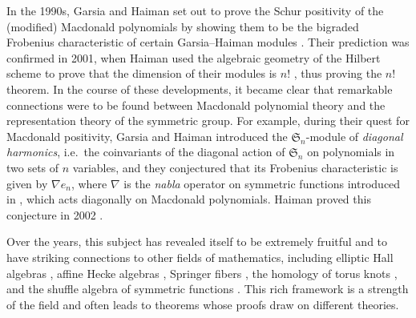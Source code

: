 \documentclass[reqno]{amsart}
\theoremstyle{plain}
\theoremstyle{definition}
\theoremstyle{remark}
\newcommand{\<}{\langle}
\renewcommand{\>}{\rangle}
\begin{document}
In the 1990s, Garsia and Haiman set out to prove the Schur positivity of the (modified) Macdonald polynomials by showing them to be the bigraded Frobenius characteristic of certain Garsia--Haiman modules \cite{GarsiaHaiman1993GradedRepresentationModel}. Their prediction was confirmed in 2001, when Haiman used the algebraic geometry of the Hilbert scheme to prove that the dimension of their modules is $n!$ \cite{Haiman2001nFactorial}, thus proving the $n!$ theorem. In the course of these developments, it became clear that remarkable connections were to be found between Macdonald polynomial theory and the representation theory of the symmetric group. For example, during their quest for Macdonald positivity, Garsia and Haiman introduced the $\mathfrak{S}_n$-module of \emph{diagonal harmonics}, i.e.\ the coinvariants of the diagonal action of $\mathfrak{S}_n$ on polynomials in two sets of $n$ variables, and they conjectured that its Frobenius characteristic is given by $\nabla e_n$, where $\nabla$ is the \emph{nabla} operator on symmetric functions introduced in \cite{BergeronGarsiaHaimanTesler1999IdentitiesPositivityConjectures}, which acts diagonally on Macdonald polynomials. Haiman proved this conjecture in 2002 \cite{Haiman2002HilbertScheme}.

Over the years, this subject has revealed itself to be extremely fruitful and to have striking connections to other fields of mathematics, including elliptic Hall algebras \cites{SchiffmannVasserot2011EllipticHallAlgebra,BHMPS2023ShuffleAnyLine}, affine Hecke algebras \cite{CarlssonMellit2018ShuffleConjecture}, Springer fibers \cite{Mellit2020SpringerFibers}, the homology of torus knots \cites{GorskyNegut2015RefinedKnotInvariants, Mellit2022HomologyTorusKnots}, and the shuffle algebra of symmetric functions \cite{Negut2014ShuffleAlgebra}. This rich framework is a strength of the field and often leads to theorems whose proofs draw on different theories.
\end{document}
